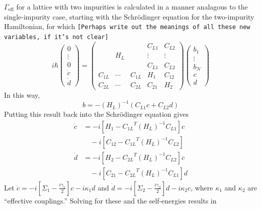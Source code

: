 \documentclass[aps,pra,superscriptaddress,twocolumn]{revtex4-1}
\newcommand{\commentSB}[1]{\texttt{\color{blue}[#1]}}
\begin{document}
$\Gamma_\text{eff}$ for a lattice with two impurities is calculated in a manner analagous to the single-impurity case, starting with the Schr\"odinger equation for the two-impurity Hamiltonian, for which  
\commentSB{Perhaps write out the meanings of all these new variables, if it's not clear}
\begin{equation}
    i \hbar \begin{pmatrix}
        0 \\ \vdots \\ 0 \\ \dot{c} \\ \dot{d}
    \end{pmatrix}
    = \begin{pmatrix}
        ~ & ~ & ~ &   C_{L1} & C_{L2} \\ 
        ~ & H_L & ~ & \vdots & \vdots \\
        ~ & ~ & ~ & C_{L1} &  C_{L2} \\
        C_{1L} & \cdots & C_{1L} & H_1 & C_{12} \\
        C_{2L} & \cdots & C_{2L} & C_{21} & H_2  
    \end{pmatrix} 
    \begin{pmatrix}
        b_1 \\ \vdots \\ b_N \\ c \\ d
    \end{pmatrix}
    \label{eqn:blockH2}
\end{equation}
In this way, 
\begin{equation}
    b = -(H_L)^{-1} (C_{L1} c + C_{L2} d)
\end{equation}
Putting this result back into the Schr\"odinger equation gives
\begin{subequations}
\begin{align}
    \dot{c} &= -i \left[  H_1 - {C_{1L}}^T (H_L)^{-1} C_{L1}\right] c \nonumber\\
     &\quad- i \left[  C_{12} - {C_{1L}}^T (H_L)^{-1} C_{L2} \right]  \\
    \dot{d} &= -i \left[  H_2 - {C_{2L}}^T (H_L)^{-1} C_{L2}\right] c \nonumber\\
     &\quad- i \left[  C_{21} - {C_{2L}}^T (H_L)^{-1} C_{L1} \right] d 
\end{align}
\end{subequations}
Let $\dot{c} = -i [\Sigma_1 - \frac{i \gamma_1}{2}]c - i \kappa_1 d $ and $\dot{d} = -i [ \Sigma_2 - \frac{i \gamma_2}{2} ] d - i \kappa_2 c $, where $\kappa_1$ and $\kappa_2$ are ``effective couplings.'' Solving for these and the self-energies results in 
\end{document}
